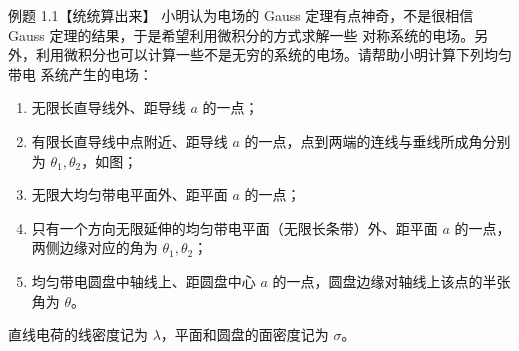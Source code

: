 \begin{origexamplebox}{例题 1.1【统统算出来】}
小明认为电场的 Gauss 定理有点神奇，不是很相信 Gauss 定理的结果，于是希望利用微积分的方式求解一些
对称系统的电场。另外，利用微积分也可以计算一些不是无穷的系统的电场。请帮助小明计算下列均匀带电
系统产生的电场：
\begin{enumerate}[label=\arabic*.]
  \item 无限长直导线外、距导线 $a$ 的一点；
  \item 有限长直导线中点附近、距导线 $a$ 的一点，点到两端的连线与垂线所成角分别为
  $\theta_1,\theta_2$，如图；
  \item 无限大均匀带电平面外、距平面 $a$ 的一点；
  \item 只有一个方向无限延伸的均匀带电平面（无限长条带）外、距平面 $a$ 的一点，两侧边缘对应的角为
  $\theta_1,\theta_2$；
  \item 均匀带电圆盘中轴线上、距圆盘中心 $a$ 的一点，圆盘边缘对轴线上该点的半张角为 $\theta$。
\end{enumerate}
直线电荷的线密度记为 $\lambda$，平面和圆盘的面密度记为 $\sigma$。
\emFiniteLineQuestion
{}\label{fig:em-question-1}
\end{origexamplebox}

